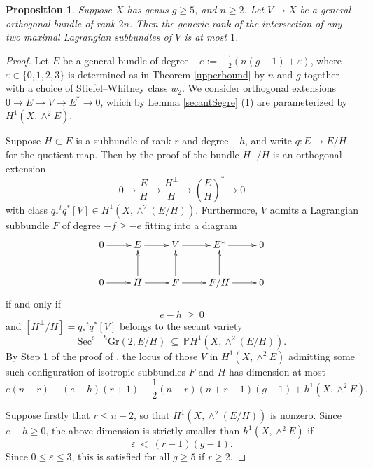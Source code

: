 \documentclass[10pt]{amsart}
\numberwithin{equation}{section}
\newcommand{\pp}{\mathbb P}
\newcommand{\Sec}{\mathrm{Sec}}
\newcommand{\Gr}{\mathrm{Gr}}
\newtheorem{prop}[theorem]{{\textbf Proposition}}
\begin{document}
\begin{prop} Suppose $X$ has genus $g \ge 5$, and $n \ge 2$. Let $V \to X$ be a general orthogonal bundle of rank $2n$. Then the generic rank of the intersection of any two maximal Lagrangian subbundles of $V$ is at most $1$. \label{dimcount}
\end{prop}
\begin{proof} Let $E$ be a general bundle of degree $-e := -\frac{1}{2}(n(g-1) + \varepsilon)$, where $\varepsilon \in \{0, 1, 2, 3\}$ is determined as in Theorem \ref{upperbound} by $n$ and $g$ together with a choice of Stiefel--Whitney class $w_2$. We consider orthogonal extensions $0 \to E \to V \to E^* \to 0$, which by Lemma \ref{secantSegre} (1) are parameterized by $H^1 (X, \wedge^2 E)$.

Suppose $H \subset E$ is a subbundle of rank $r$ and degree $-h$, and write $q \colon E \to E/H$ for the quotient map. Then by the proof of \cite[Criterion 2.3 (2)]{CH3} the bundle $H^\perp / H$ is an orthogonal extension
\[ 0 \to \frac{E}{H} \to \frac{H^\perp}{H} \to \left( \frac{E}{H} \right)^* \to 0 \]
with class $q_* {^tq^*}[V] \in H^1 (X, \wedge^2 (E/H))$. Furthermore, $V$ admits a Lagrangian subbundle $F$ of degree $-f \ge -e$ fitting into a diagram
\[ \xymatrix{ 0 \ar[r] & E \ar[r] & V \ar[r] & E^* \ar[r] & 0 \\
 0 \ar[r] & H \ar[u] \ar[r] & F \ar[u] \ar[r] & F/H \ar[u] \ar[r] & 0 } \]
if and only if
\begin{equation} e-h \ \ge \ 0 \label{emhpos} \end{equation}
and $\left[ H^\perp / H \right] = q_* {^tq^*}[V]$ belongs to the secant variety
\[ \Sec^{e-h} \Gr (2, E/H) \ \subseteq \ \pp H^1 \left(X, \wedge^2 (E/H) \right). \]
By Step 1 of the proof of \cite[Theorem 5.1]{CH3}, the locus of those $V$ in $H^1 (X, \wedge^2 E)$ admitting some such configuration of isotropic subbundles $F$ and $H$ has dimension at most
\begin{equation} e(n - r) - (e - h)(r + 1) - \frac{1}{2}(n - r)(n + r - 1)(g - 1) + h^1 (X, \wedge^2 E). \label{bigdim} \end{equation}

Suppose firstly that $r \le n-2$, so that $H^1 (X, \wedge^2 (E/H))$ is nonzero. Since $e-h \ge 0$, the above dimension is strictly smaller than $h^1 (X, \wedge^2 E)$ if
\[ \varepsilon \ < \ (r-1)(g-1). \]
Since $0 \le \varepsilon \le 3$, this is satisfied for all $g \ge 5$ if $r \ge 2$.


\end{proof}
\end{document}
